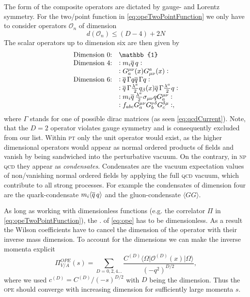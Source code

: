 \documentclass[../../index.tex]{subfiles}
\begin{document}
The form of the composite operators are dictated by gauge- and Lorentz symmetry.
For the two\-/point function in \cref{eq:opeTwoPointFunction} we only have to
consider operators \(\mathcal{O}_n\) of dimension
\begin{equation}
  d \left( \mathcal{O}_n \right) \leq (D - 4) + 2N
\end{equation}
The scalar operators up to dimension six are then given by \cite{Pascual1984}
\begin{equation}
  \begin{array}{ll}
    \text{Dimension 0:} & \mathbb{1} \\
    \text{Dimension 4:} & :m_i \anti{q} q: \\
                        & :G_a^{\mu\nu}(x) G_{\mu\nu}^a(x): \\
    \text{Dimension 6:} & :\anti{q} \Gamma q \anti{q} \Gamma q: \\
                        & :\anti{q} \Gamma \frac{\lambda^a}{2} q_\beta(x) \anti{q} \Gamma \frac{\lambda^a}{2} q: \\
                        & :m_i \anti{q} \frac{\lambda^a}{2} \sigma_{\mu\nu} q G^{\mu\nu}_a: \\
                        & :f_{abc} G_a^{\mu\nu} G_b^{\nu\delta} G_c^{\delta\mu}:,
  \end{array}
\end{equation}
where \(\Gamma\) stands for one of possible dirac matrices (as seen
\cref{eq:qcdCurrent}). Note, that the \(D=2\) operator violates gauge symmetry
and is consequently excluded from our list. Within \textsc{pt} only the unit
operator would exist, as the higher dimensional operators would appear as normal
ordered products of fields and vanish by being sandwiched into the perturbative
vacuum. On the contrary, in \textsc{np qcd} they appear as \textit{condensates}.
Condensates are the vacuum expectation values of non\-/vanishing normal ordered
fields by applying the full \textsc{qcd} vacuum, which contribute to all strong
processes. For example the condensates of dimension four are the
quark-condensate \(m_i\langle \overline{q}\, q \rangle\) and the gluon-condensate
\(\langle GG \rangle\).

As long as working with dimensionless functions (e.g. the correlator \(\Pi\) in
\cref{eq:opeTwoPointFunction}), the . of
\cref{eq:ope} has to be dimensionless. As a result the Wilson coefficients have
to cancel the dimension of the operator with their inverse mass dimension. To
account for the dimensions we can make the inverse momenta explicit
\begin{equation}
  \Pi_{V/A}^{OPE}(s) = \sum_{D=0,2,4\dots} \frac{C^{(D)}
    \langle\Omega\vert \mathcal{O}^{(D)}(x) \vert\Omega\rangle}{(-q^2)^{D/2}},
\end{equation}
where we used \(c^{(D)}=C^{(D)}/(-s)^{D/2}\) with \(D\) being the dimension. Thus the
\textsc{ope} should converge with increasing dimension for sufficiently large
momenta \(s\).
\end{document}
